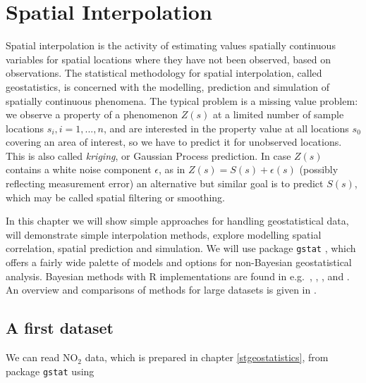 \documentclass[]{book}
\begin{document}
\hypertarget{interpolation}{%
\chapter{Spatial Interpolation}\label{interpolation}}

Spatial interpolation is the activity of estimating values spatially
continuous variables for spatial locations where they have not
been observed, based on observations. The statistical methodology
for spatial interpolation, called geostatistics, is concerned with
the modelling, prediction and simulation of spatially continuous
phenomena. The typical problem is a missing value problem: we
observe a property of a phenomenon \(Z(s)\) at a limited number
of sample locations \(s_i, i = 1,...,n\), and are interested in
the property value at all locations \(s_0\) covering an area of
interest, so we have to predict it for unobserved locations. This
is also called \emph{kriging}, or Gaussian Process prediction.
In case \(Z(s)\) contains a white noise component \(\epsilon\), as in
\(Z(s)=S(s)+\epsilon(s)\) (possibly reflecting measurement error)
an alternative but similar goal is to predict \(S(s)\), which may be
called spatial filtering or smoothing.

In this chapter we will show simple approaches for handling
geostatistical data, will demonstrate simple interpolation methods,
explore modelling spatial correlation, spatial prediction and
simulation. We will use package \texttt{gstat} \citep{R-gstat, gstatcg},
which offers a fairly wide palette of models and options for
non-Bayesian geostatistical analysis. Bayesian methods with
R implementations are found in e.g.~\citet{DiggleTawnMoyeed:98},
\citet{Diggle:2007}, \citet{blangiardo2015spatial}, and \citet{wikle2019spatio}. An overview
and comparisons of methods for large datasets is given in
\citet{Heaton2018}.

\hypertarget{a-first-dataset}{%
\section{A first dataset}\label{a-first-dataset}}

We can read NO\(_2\) data, which is prepared in chapter \ref{stgeostatistics}, from
package \texttt{gstat} using
\end{document}
